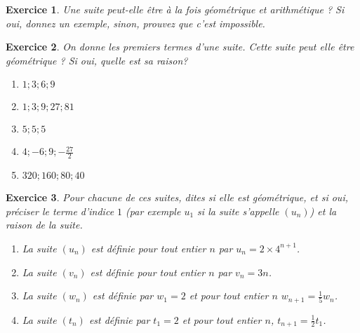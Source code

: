 \documentclass[10pt,a4paper]{article}
\newtheorem{exo}{Exercice}
\begin{document}
\begin{exo}
    Une suite peut-elle être à la fois géométrique et arithmétique ? Si oui, donnez un exemple, sinon, prouvez que c'est impossible.
\end{exo}
\vspace{20mm}
\begin{exo}
    On donne les premiers termes d'une suite. Cette suite peut elle être géométrique ? Si oui, quelle est sa raison?
    \begin{enumerate}
    \item   $1;3;6;9$
    \item   $1;3;9;27; 81$
    \item   $5;5;5$
    \item $4;-6;9;-\frac{27}{2}$
    \item $320;160;80;40$
    \end{enumerate}
\end{exo}

\begin{exo}
    Pour chacune de ces suites, dites si elle est géométrique, et si oui, préciser le terme d'indice $1$ (par exemple $u_1$ si la suite s'appelle $(u_n)$) et la raison de la suite. 
    \begin{enumerate}
        \item La suite $(u_n)$ est définie pour tout entier $n$ par $u_n = 2 \times 4^{n+1}$.
        \item La suite $(v_n)$ est définie pour tout entier $n$ par $v_n = 3n$.
        \item La suite $(w_n)$ est définie par $w_1=2$ et pour tout entier $n$ $w_{n+1} = \frac{1}{5}w_n$.
        \item La suite $(t_n)$ est définie par $t_1=2$ et pour tout entier $n$, $t_{n+1} = \frac{1}{2}t_1$.
    \end{enumerate}
\end{exo}


\newpage
\end{document}
